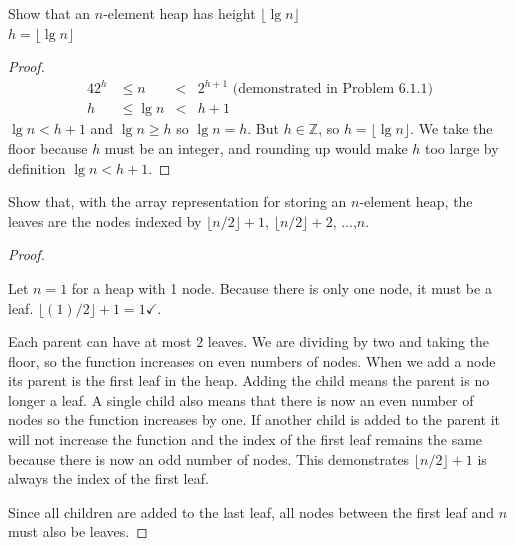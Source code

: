 \documentclass[12pt]{article}
\newcommand{\Z}{\mathbb{Z}}
\newenvironment{problem}[2][Problem]{\begin{trivlist}
\item[\hskip \labelsep {\bfseries #1}\hskip \labelsep {\bfseries #2.}]}{\end{trivlist}}
\begin{document}
\newpage
\begin{problem}{6.1-2} Show that an $n$-element heap has height $\lfloor \lg n \rfloor$ \\
  \claim $h = \lfloor \lg n \rfloor$
  \begin{proof}
    \begin{alignat*}{4}
      2^{h} &\le n &<& 2^{h+1} \text{ (demonstrated in Problem 6.1.1)} \\
      h &\le \lg n &<& h+1
    \end{alignat*}
    $\lg n < h + 1$ and $\lg n \ge h$ so $\lg n = h$. But $h \in \Z$, so $h = \lfloor \lg n \rfloor$. We take
    the floor because $h$ must be an integer, and rounding up would make $h$ too large by definition $\lg n < h + 1$.
  \end{proof}
\end{problem}

\begin{problem}{6.1-7} Show that, with the array representation for storing an $n$-element heap, the leaves are the nodes indexed
  by $\lfloor n/2 \rfloor + 1$, $\lfloor n/2 \rfloor + 2$, $\ldots$,$n$.
  \begin{proof}\ \\


    Let $n = 1$ for a heap with 1 node.
    Because there is only one node, it must be a leaf. $\lfloor (1)/2 \rfloor + 1 = 1\checkmark$. \\


     Each parent can have at most $2$ leaves. We are dividing by two and taking the floor, so the function increases on even numbers of nodes.
     When we add a node its parent is the first leaf in the heap. Adding the child means the parent is no longer a leaf. A single child also means that there is now an even
     number of nodes so the function increases by one. If another child is added to the parent it will not increase the function
     and the index of the first leaf remains the same because there is now an odd number of nodes. This demonstrates $\lfloor n/2 \rfloor + 1$ is always the index of the first leaf.

     Since all children are added to the last leaf, all nodes between the first leaf and $n$ must also be leaves.
  \end{proof}
\end{problem} \newpage
\end{document}
